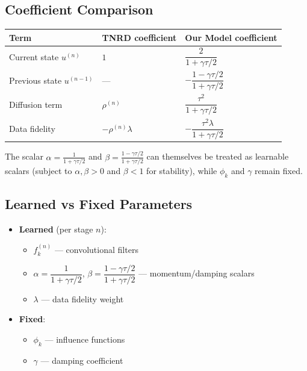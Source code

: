 \documentclass{report}
\begin{document}
\subsection*{Coefficient Comparison}
\begin{center}
	\begin{tabular}{lll}
		\hline
		\textbf{Term}              & \textbf{TNRD coefficient} & \textbf{Our Model coefficient}                \\
		\hline
		Current state $u^{(n)}$    & $1$                       & $\dfrac{2}{1 + \gamma\tau/2}$                 \\[6pt]
		Previous state $u^{(n-1)}$ & ---                       & $-\dfrac{1 - \gamma\tau/2}{1 + \gamma\tau/2}$ \\[6pt]
		Diffusion term             & $\rho^{(n)}$              & $\dfrac{\tau^2}{1 + \gamma\tau/2}$            \\[6pt]
		Data fidelity              & $-\rho^{(n)}\lambda$      & $-\dfrac{\tau^2\lambda}{1 + \gamma\tau/2}$    \\
		\hline
	\end{tabular}
\end{center}

The scalar $\alpha = \tfrac{1}{1+\gamma\tau/2}$ and $\beta = \tfrac{1-\gamma\tau/2}{1+\gamma\tau/2}$ can themselves be treated as learnable scalars (subject to $\alpha, \beta > 0$ and $\beta < 1$ for stability), while $\phi_k$ and $\gamma$ remain fixed.

\subsection*{Learned vs Fixed Parameters}

\begin{itemize}
	\item \textbf{Learned} (per stage $n$):
	      \begin{itemize}
		      \item $f_k^{(n)}$ — convolutional filters
		      \item $\alpha = \dfrac{1}{1+\gamma\tau/2}$, $\beta = \dfrac{1-\gamma\tau/2}{1+\gamma\tau/2}$ — momentum/damping scalars
		      \item $\lambda$ — data fidelity weight
	      \end{itemize}
	\item \textbf{Fixed}:
	      \begin{itemize}
		      \item $\phi_k$ — influence functions
		      \item $\gamma$ — damping coefficient
	      \end{itemize}
\end{itemize}

\end{document}
